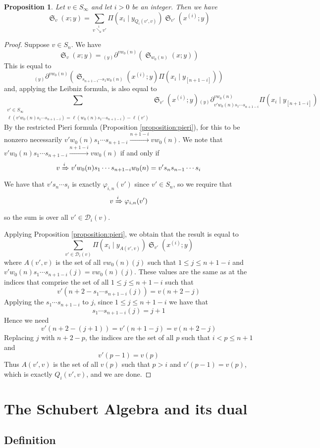 \documentclass{amsart}
\newtheorem{proposition}[lemma]{Proposition}
\theoremstyle{definition}
\theoremstyle{remark}
\numberwithin{equation}{subsection}
\DeclareMathOperator{\sch}{\mathfrak{S}}
\newcommand{\downvar}[1]{\stackrel{#1}{\searrow}}
\newcommand{\tom}[1]{\xrightarrow{#1}}
\newcommand{\Tom}[1]{\xRightarrow{#1}}
\newcommand{\smpfu}{\mathsf{\Pi}}
\newcommand{\smpr}[3]{\ensuremath{}\smpfu\left( #1 \mid #2_{[#3]}\right)}
\newcommand{\smpre}[2]{\ensuremath{}\smpfu\left( #1 \mid #2\right)}
\newcommand{\ddv}[1]{{{}_{{\scriptscriptstyle (#1)}}\partial}}
\begin{document}
\begin{proposition} \label{proposition:pullindex}
Let $v\in S_\infty$ and let $i>0$ be an integer. Then we have
$$\sch_v(x;y)=\sum_{v\downvar{i} v'}\smpre{x_i}{y_{Q_i(v',v)}}\sch_{v'}(x^{(i)};y)$$
\end{proposition}
\begin{proof}
Suppose $v\in S_n$. We have
$$\sch_v(x;y)=\ddv{y}^{vw_0(n)}(\sch_{w_0(n)}(x;y))$$
This is equal to
$$\ddv{y}^{vw_0(n)}(\sch_{s_{n+1-i}\cdots s_1w_0(n)}(x^{(i)};y)\smpr{x_i}{y}{n+1-i})$$
and, applying the Leibniz formula, is also equal to
$$\sum_{\substack{v'\in S_\infty\\\ell(v'w_0(n)s_1\cdots s_{n+1-i})=\ell(w_0(n)s_1\cdots s_{n+1-i})-\ell(v')}}\sch_{v'}(x^{(i)};y)\ddv{y}_{v'w_0(n)s_1\cdots s_{n+1-i}}^{vw_0(n)}\smpr{x_i}{y}{n+1-i}$$
By the restricted Pieri formula (Proposition \ref{proposition:pieri}), for this to be nonzero necessarily $v'w_0(n)s_1\cdots s_{n+1-i}\tom{n+1-i}vw_0(n)$. We note that $v'w_0(n)s_1\cdots s_{n+1-i}\tom{n+1-i}vw_0(n)$ if and only if 
$$v\Tom{i}v'w_0(n)s_1\cdots s_{n+1-i}w_0(n)=v's_ns_{n-1}\cdots s_i$$
We have that $v's_n\cdots s_i$ is exactly $\varphi_{i,n}(v')$ since $v'\in S_n$, so we require that
$$v\Tom{i}\varphi_{i,n}(v')$$
so the sum is over all $v'\in \mathcal{D}_i(v)$.

Applying Proposition \ref{proposition:pieri}, we obtain that the result is equal to
$$\sum_{v'\in \mathcal{D}_i(v)} \smpre{x_i}{y_{A(v',v)}}\sch_{v'}(x^{(i)};y)$$
where $A(v',v)$ is the set of all $vw_0(n)(j)$ such that $1\leq j\leq n+1-i$ and $v'w_0(n)s_1\cdots s_{n+1-i}(j)=vw_0(n)(j)$. These values are the same as at the indices that comprise the set of all $1\leq j\leq n+1-i$ such that
$$v'(n+2-s_1\cdots s_{n+1-i}(j))=v(n+2-j)$$
Applying the $s_1\cdots s_{n+1-i}$ to $j$, since $1\leq j\leq n+1-i$ we have that 
$$s_1\cdots s_{n+1-i}(j)=j+1$$
Hence we need
$$v'(n+2-(j+1))=v'(n+1-j)=v(n+2-j)$$
Replacing $j$ with $n+2-p$, the indices are the set of all $p$ such that $i<p\leq n+1$ and
$$v'(p-1)=v(p)$$
Thus $A(v',v)$ is the set of all $v(p)$ such that $p>i$ and $v'(p-1)=v(p)$, which is exactly $Q_i(v',v)$, and we are done.
\end{proof}


\section{The Schubert Algebra and its dual}

\subsection{Definition}
\end{document}
